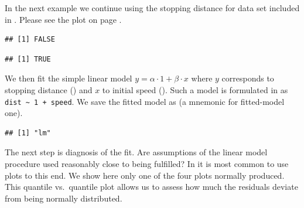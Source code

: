 \documentclass[krantz2]{krantz}\usepackage{knitr}
\begin{document}
In the next example we continue using the stopping distance for  data set included in \Rpgrm. Please see the plot on page \pageref{chunk:plot:cars}.
\label{xmpl:fun:lm:fm1}

\begin{knitrout}\footnotesize
{}\color{fgcolor}\begin{kframe}
\begin{alltt}
\hlopt{$}
\end{alltt}
\begin{verbatim}
## [1] FALSE
\end{verbatim}
\begin{alltt}
\hlopt{$}
\end{alltt}
\begin{verbatim}
## [1] TRUE
\end{verbatim}
\end{kframe}
\end{knitrout}

We then fit the simple linear model $y = \alpha \cdot 1 + \beta \cdot x$ where $y$ corresponds to stopping distance () and $x$ to initial speed (). Such a model is formulated in \Rlang as \verb|dist ~ 1 + speed|. We save the fitted model as  (a mnemonic for fitted-model one).

\begin{knitrout}\footnotesize
{}\color{fgcolor}\begin{kframe}
\begin{alltt}
 \hlkwb{<-}  \hlopt{~}  \hlopt{+}  
\end{alltt}
\begin{verbatim}
## [1] "lm"
\end{verbatim}
\end{kframe}
\end{knitrout}

The next step is diagnosis of the fit. Are assumptions of the linear model procedure used reasonably close to being fulfilled? In \Rlang it is most common to use plots to this end. We show here only one of the four plots normally produced. This quantile vs.\ quantile plot allows us to assess how much the residuals deviate from being normally distributed.
\end{document}
